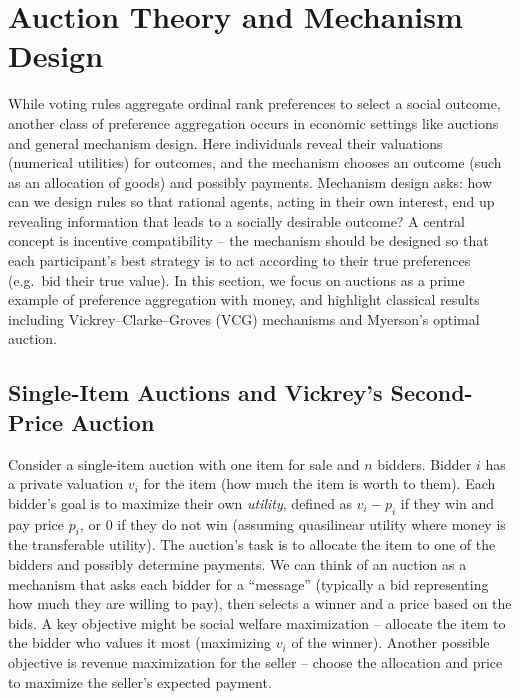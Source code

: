 \documentclass[
  letterpaper,
  numbers=noenddot,
  DIV=11]{scrreprt}
\theoremstyle{definition}
\theoremstyle{plain}
\theoremstyle{plain}
\theoremstyle{remark}
\begin{document}
\section{Auction Theory and Mechanism
Design}\label{single-item-auctions}

While voting rules aggregate ordinal rank preferences to select a social
outcome, another class of preference aggregation occurs in economic
settings like auctions and general mechanism design. Here individuals
reveal their valuations (numerical utilities) for outcomes, and the
mechanism chooses an outcome (such as an allocation of goods) and
possibly payments. Mechanism design asks: how can we design rules so
that rational agents, acting in their own interest, end up revealing
information that leads to a socially desirable outcome? A central
concept is incentive compatibility -- the mechanism should be designed
so that each participant's best strategy is to act according to their
true preferences (e.g.~bid their true value). In this section, we focus
on auctions as a prime example of preference aggregation with money, and
highlight classical results including Vickrey--Clarke--Groves (VCG)
mechanisms and Myerson's optimal auction.

\subsection{Single-Item Auctions and Vickrey's Second-Price
Auction}\label{single-item-auctions-and-vickreys-second-price-auction}

Consider a single-item auction with one item for sale and \(n\) bidders.
Bidder \(i\) has a private valuation \(v_i\) for the item (how much the
item is worth to them). Each bidder's goal is to maximize their own
\emph{utility}, defined as \(v_i - p_i\) if they win and pay price
\(p_i\), or \(0\) if they do not win (assuming quasilinear utility where
money is the transferable utility). The auction's task is to allocate
the item to one of the bidders and possibly determine payments. We can
think of an auction as a mechanism that asks each bidder for a
``message'' (typically a bid representing how much they are willing to
pay), then selects a winner and a price based on the bids. A key
objective might be social welfare maximization -- allocate the item to
the bidder who values it most (maximizing \(v_i\) of the winner).
Another possible objective is revenue maximization for the seller --
choose the allocation and price to maximize the seller's expected
payment.
\end{document}
